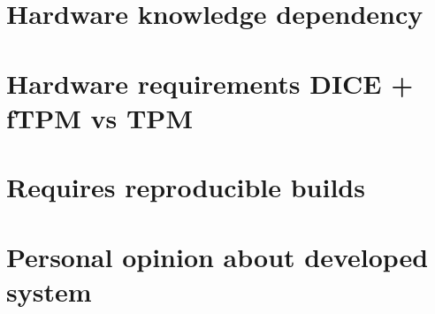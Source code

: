 
\section{Hardware knowledge dependency}



\section{Hardware requirements DICE + fTPM vs TPM}


\section{Requires reproducible builds}


\section{Personal opinion about developed system}


